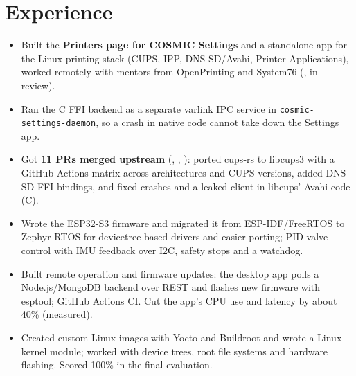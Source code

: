 \documentclass[10pt]{article}
\begin{document}
\section*{Experience}
\begin{itemize}
  \item Built the \textbf{Printers page for COSMIC Settings} and a standalone app for the Linux printing stack (CUPS, IPP, DNS-SD/Avahi, Printer Applications), worked remotely with mentors from OpenPrinting and System76 (, in review).
  \item Ran the C FFI backend as a separate varlink IPC service in \texttt{cosmic-settings-daemon}, so a crash in native code cannot take down the Settings app.
  \item Got \textbf{11 PRs merged upstream} (, , ): ported cups-rs to libcups3 with a GitHub Actions matrix across architectures and CUPS versions, added DNS-SD FFI bindings, and fixed crashes and a leaked client in libcups' Avahi code (C).
\end{itemize}
\begin{itemize}
  \item Wrote the ESP32-S3 firmware and migrated it from ESP-IDF/FreeRTOS to Zephyr RTOS for devicetree-based drivers and easier porting; PID valve control with IMU feedback over I2C, safety stops and a watchdog.
  \item Built remote operation and firmware updates: the desktop app polls a Node.js/MongoDB backend over REST and flashes new firmware with esptool; GitHub Actions CI. Cut the app's CPU use and latency by about 40\% (measured).
\end{itemize}
\begin{itemize}
  \item Created custom Linux images with Yocto and Buildroot and wrote a Linux kernel module; worked with device trees, root file systems and hardware flashing. Scored 100\% in the final evaluation.
\end{itemize}
\end{document}
